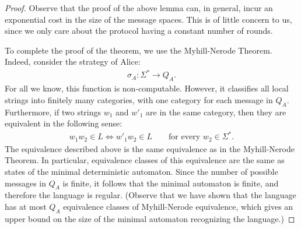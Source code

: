\begin{proof}
  Observe that the proof of the above lemma can, in general, incur an exponential cost in the size of the message spaces. This is of little concern to us, since we only care about the protocol having a constant number of rounds.

  To complete the proof of the theorem, we use the  Myhill-Nerode Theorem.  Indeed, consider the strategy of  Alice: 
  \begin{align*}
  \sigma_A : \Sigma^* \to Q_A.
  \end{align*}
  For all we know, this function is non-computable. However, it classifies all local strings into finitely many categories, with one category for each message in $Q_A$. Furthermore, if two strings $w_1$ and $w'_1$ are in the same category, then they are equivalent in the following sense: 
  \begin{align}\label{eq:myhill-nerode-equivalence}
  w_1 w_2 \in L \Leftrightarrow w'_1 w_2 \in L 
  \qquad \text{for every $w_2 \in \Sigma^*$.}
  \end{align}
  The equivalence described above is the same equivalence as in the Myhill-Nerode Theorem. In particular, equivalence classes of this equivalence are the same as states of the minimal deterministic automaton. Since the number of possible messages in $Q_A$ is finite, it follows that the minimal automaton is finite, and therefore the language is regular.  (Observe that we have shown that the language has at most $Q_A$ equivalence classes of Myhill-Nerode equivalence, which gives an upper bound on the size of the minimal automaton recognizing the language.)
\end{proof}

